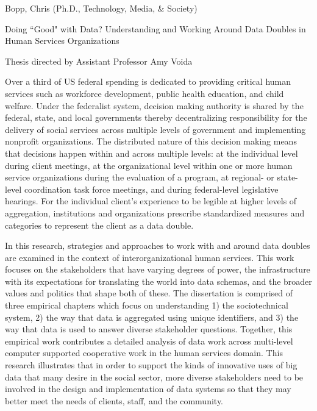 \documentclass[11pt,openany,oneside]{book}
\newcommand{\dtitle}{Doing ``Good" with Data? Understanding and Working Around Data Doubles in Human Services Organizations}
\begin{document}
\thispagestyle{plain}
{\large \noindent Bopp, Chris (Ph.D., Technology, Media, \& Society)\par}
{\large \noindent \dtitle\par}
{\large \noindent Thesis directed by Assistant Professor Amy Voida\par}
\vspace{1cm}
Over a third of US federal spending is dedicated to providing critical human services such as workforce development, public health education, and child welfare. Under the federalist system, decision making authority is shared by the federal, state, and local governments thereby decentralizing responsibility for the delivery of social services across multiple levels of government and implementing nonprofit organizations. The distributed nature of this decision making means that decisions happen within and across multiple levels: at the individual level during client meetings, at the organizational level within one or more human service organizations during the evaluation of a program, at regional- or state- level coordination task force meetings, and during federal-level legislative hearings. For the individual client’s experience to be legible at higher levels of aggregation, institutions and organizations prescribe standardized measures and categories to represent the client as a data double.

In this research, strategies and approaches to work with and around data doubles are examined in the context of interorganizational human services. This work focuses on the stakeholders that have varying degrees of power, the infrastructure with its expectations for translating the world into data schemas, and the broader values and politics that shape both of these. The dissertation is comprised of three empirical chapters which focus on understanding 1) the sociotechnical system, 2) the way that data is aggregated using unique identifiers, and 3) the way that data is used to answer diverse stakeholder questions. Together, this empirical work contributes a detailed analysis of data work across multi-level computer supported cooperative work in the human services domain. This research illustrates that in order to support the kinds of innovative uses of big data that many desire in the social sector, more diverse stakeholders need to be involved in the design and implementation of data systems so that they may better meet the needs of clients, staff, and the community.

\clearpage
 
\end{document}
